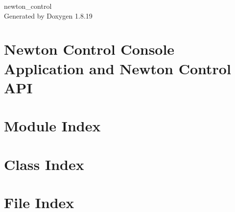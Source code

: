 \let\mypdfximage\pdfximage\def\pdfximage{\immediate\mypdfximage}\documentclass[twoside]{book}
\newcommand{\+}{\discretionary{\mbox{\scriptsize$\hookleftarrow$}}{}{}}
\newcommand{\clearemptydoublepage}{%
  \newpage{\pagestyle{empty}\cleardoublepage}%
}
\begin{document}
\hypersetup{pageanchor=false,
             bookmarksnumbered=true,
             pdfencoding=unicode
            }
\begin{titlepage}
\vspace*{7cm}
\begin{center}%
{\Large newton\+\_\+control }\\
\vspace*{1cm}
{\large Generated by Doxygen 1.8.19}\\
\end{center}
\end{titlepage}
\clearemptydoublepage
{}
\tableofcontents
\clearemptydoublepage
{}
\hypersetup{pageanchor=true}

\chapter{Newton Control Console Application and Newton Control A\+PI}
\label{index}\hypertarget{index}{}
\chapter{Module Index}

\chapter{Class Index}

\chapter{File Index}

\end{document}
